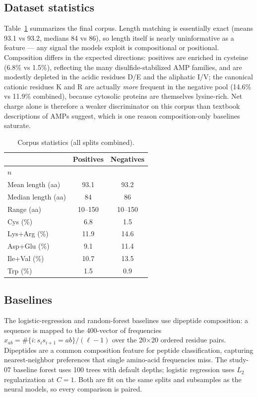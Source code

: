 \subsection{Dataset statistics}
Table~\ref{tab:stats} summarizes the final corpus. Length matching is
essentially exact (means 93.1 vs 93.2, medians 84 vs 86), so length itself is
nearly uninformative as a feature --- any signal the models exploit is
compositional or positional. Composition differs in the expected directions:
positives are enriched in cysteine (6.8\% vs 1.5\%), reflecting the many
disulfide-stabilized AMP families, and are modestly depleted in the acidic
residues D/E and the aliphatic I/V; the canonical cationic residues K and R
are actually \emph{more} frequent in the negative pool (14.6\% vs 11.9\%
combined), because cytosolic proteins are themselves lysine-rich. Net charge
alone is therefore a weaker discriminator on this corpus than textbook
descriptions of AMPs suggest, which is one reason composition-only baselines
saturate.

\begin{table}[h]\centering\caption{Corpus statistics (all splits combined).}
\label{tab:stats}
\begin{tabular}{lcc}\hline
 & Positives & Negatives \\ \hline
$n$ & \Npos{} & \Nneg{} \\
Mean length (aa) & 93.1 & 93.2 \\
Median length (aa) & 84 & 86 \\
Range (aa) & 10--150 & 10--150 \\
Cys (\%) & 6.8 & 1.5 \\
Lys+Arg (\%) & 11.9 & 14.6 \\
Asp+Glu (\%) & 9.1 & 11.4 \\
Ile+Val (\%) & 10.7 & 13.5 \\
Trp (\%) & 1.5 & 0.9 \\
\hline\end{tabular}\end{table}

\subsection{Baselines}
The logistic-regression and random-forest baselines use dipeptide composition:
a sequence is mapped to the 400-vector of frequencies
$x_{ab} = \#\{i : s_i s_{i+1} = ab\}/(\ell-1)$ over the 20$\times$20 ordered
residue pairs. Dipeptides are a common composition feature for
peptide classification, capturing nearest-neighbor preferences that single
amino-acid frequencies miss. The study-07 baseline forest uses 100 trees with default depths;
logistic regression uses $L_2$ regularization at $C=1$. Both are fit on the
same splits and subsamples as the neural models, so every comparison is
paired.

